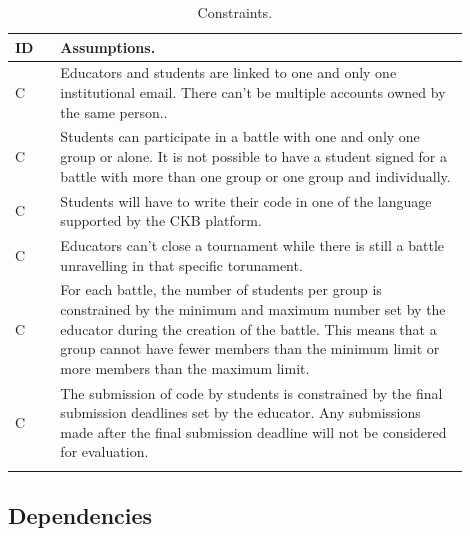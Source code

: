 \setcounter{cc}{0}
\newcommand{\ccc}{\stepcounter{cc}\theac}

\newcommand{\ccrow}[1]{
    C\ccc & #1 \\
    \hline
}

\begin{center}
    \begin{longtable}{ |l|p{0.9\linewidth}| }
        \hline
        \textbf{ID} & \textbf{Assumptions}.                                   \\
        \hline
        C\ccc        & Educators and students are linked to one and only one institutional email. There can't be multiple accounts owned by the same person..                                  \\
        \hline
        C\ccc        & Students can participate in a battle with one and only one group or alone. It is not possible to have a student signed 
        for a battle with more than one group or one group and individually. \\
        \hline
        C\ccc        & Students will have to write their code in one of the language supported by the CKB platform.                                                             \\
        \hline
        C\ccc        & Educators can't close a tournament while there is still a battle unravelling in that specific torunament.                                  \\
        \hline
        C\ccc        & For each battle, the number of students per group is constrained by the minimum and maximum number set by 
        the educator during the creation of the battle. This means that a group cannot have fewer members 
        than the minimum limit or more members than the maximum limit.                      \\
        \hline
        C\ccc        & The submission of code by students is constrained by the final submission deadlines set by the educator. Any submissions made after the final submission deadline will not be considered for evaluation.                                                \\
        \hline
        \caption{Constraints.}
        \label{tab:constraints_tab}%
    \end{longtable}
\end{center}

\subsection{Dependencies}

